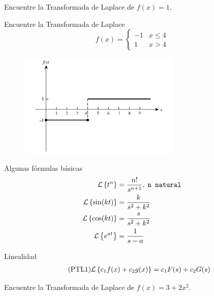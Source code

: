  \begin{problema}
  \label{bron:exmp:21.4}
  Encuentre la Transformada de Laplace de
  $f(x)=1.$
 \end{problema}




 \begin{problema}
  \label{bron:exmp:21.9}
  Encuentre la Transformada de Laplace
  $$f(x)=\begin{cases}
     -1 & x\leq 4\\
     1 & x>4
    \end{cases}
$$
 \end{problema}




 \begin{figure}
 \centering
 \includegraphics[height=5cm,keepaspectratio=true]{./edo/img0401.png}
 \label{fig:0401}
\end{figure}


{Algunas fórmulas básicas}
\begin{align}
 \label{lap:11}
 \mathcal{L}\left\{ t^{n} \right\} &= \dfrac{n!}{s^{n+1}}, \; \texttt{n natural} \\
 \label{lap:13}
 \mathcal{L}\left\{ \sin(kt) \right\}&=\dfrac{k}{s^2+k^2} \\
 \label{lap:14}
 \mathcal{L}\left\{ \cos(kt) \right\}&=\dfrac{s}{s^2+k^2} \\
 \label{lap:15}
 \mathcal{L}\left\{ e^{at} \right\}&=\frac{1}{s-a}
\end{align}



{Linealidad}
\begin{align}
  \label{bron:21.3}
  \tag{PTL1}
  \mathcal{L}\left\{ c_{1}f(x)+c_{2}g(x) \right\}=c_{1}F(s)+c_{2}G(s)
\end{align}



 \begin{problema}
 \label{bron:exmp:21.10}
 Encuentre la Transformada de Laplace de $f(x)=3+2x^{2}.$
 \end{problema}



